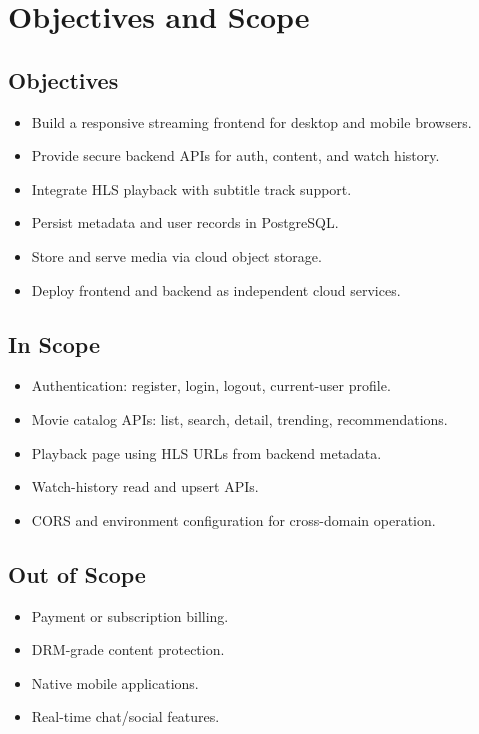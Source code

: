 \documentclass[conference]{IEEEtran}
\begin{document}
\section{Objectives and Scope}
\subsection{Objectives}
\begin{itemize}
\item Build a responsive streaming frontend for desktop and mobile browsers.
\item Provide secure backend APIs for auth, content, and watch history.
\item Integrate HLS playback with subtitle track support.
\item Persist metadata and user records in PostgreSQL.
\item Store and serve media via cloud object storage.
\item Deploy frontend and backend as independent cloud services.
\end{itemize}

\subsection{In Scope}
\begin{itemize}
\item Authentication: register, login, logout, current-user profile.
\item Movie catalog APIs: list, search, detail, trending, recommendations.
\item Playback page using HLS URLs from backend metadata.
\item Watch-history read and upsert APIs.
\item CORS and environment configuration for cross-domain operation.
\end{itemize}

\subsection{Out of Scope}
\begin{itemize}
\item Payment or subscription billing.
\item DRM-grade content protection.
\item Native mobile applications.
\item Real-time chat/social features.
\end{itemize}
\end{document}
